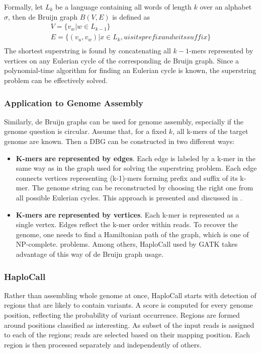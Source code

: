 Formally, let $L_k$ be a language containing all words of length $k$ over an alphabet $\sigma$, then de Bruijn graph $B(V, E)$ is defined as 
\begin{gather} 
V = \{v_w | w \in L_{k-1}\} \\ 
E = \{(v_u, v_w) | x \in L_k,  u is its prefix and w its suffix \} \\ 
\end{gather} 
The shortest superstring is found by concatenating all $k-1$-mers represented by vertices on any Eulerian cycle of the corresponding de Bruijn graph. Since a polynomial-time algorithm for finding an Eulerian cycle is known, the superstring problem can be effectively solved. 

\subsubsection{Application to Genome Assembly} 
\label{subsub:dbg-application-to-genome-assembly} 

Similarly, de Bruijn graphs can be used for genome assembly, especially if the genome question is circular. Assume that, for a fixed $k$, all k-mers of the target genome are known. Then a DBG can be constructed in two different ways: 
\begin{itemize} 
\item \textbf{K-mers are represented by edges}. Each edge is labeled by a k-mer in the same way as in the graph used for solving the superstring problem. Each edge connects vertices representing (k-1)-mers forming prefix and suffix of its k-mer. The genome string can be reconstructed by choosing the right one from all possible Eulerian cycles. This approach is presented and discussed in \cite{dbg-apply}. 
\item \textbf{K-mers are represented by vertices}. Each k-mer is represented as a single vertex. Edges reflect the k-mer order within reads. To recover the genome, one needs to find a Hamiltonian path of the graph, which is one of NP-complete. problems. Among others, HaploCall \cite{haplocall} used by GATK takes advantage of this way of de Bruijn graph usage. 
\end{itemize} 

\subsubsection{HaploCall} 
\label{subsub:haplocall} 

Rather than assembling whole genome at once, HaploCall starts with detection of regions that are likely to contain variants\cite{haplocall-1}. A score is computed for every genome position, reflecting the probability of variant occurrence. Regions are formed around positions classified as interesting. As subset of the input reads is assigned to each of the regions; reads are selected based on their mapping position. Each region is then processed separately and independently of others. 

